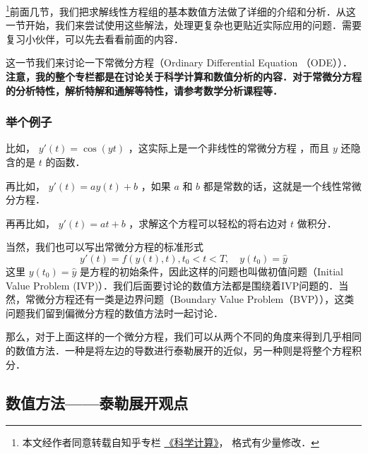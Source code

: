 
\footnote{本文经作者同意转载自知乎专栏 \href{https://www.zhihu.com/column/c_1226443594048942080}{《科学计算》}， 格式有少量修改．}前面几节，我们把求解线性方程组的基本数值方法做了详细的介绍和分析．从这一节开始，我们来尝试使用这些解法，处理更复杂也更贴近实际应用的问题．需要复习小伙伴，可以先去看看前面的内容．

这一节我们来讨论一下常微分方程（Ordinary Differential Equation （ODE））．\textbf{注意，我的整个专栏都是在讨论关于科学计算和数值分析的内容．对于常微分方程的分析特性，解析特解和通解等特性，请参考数学分析课程等．}

\subsubsection{举个例子}

比如， $y'(t)=\cos(yt)$ ，这实际上是一个非线性的常微分方程 ，而且 $y$ 还隐含的是 $t$ 的函数．

再比如， $y'(t)=ay(t)+b$ ，如果 $a$ 和 $b$ 都是常数的话，这就是一个线性常微分方程．

再再比如， $y'(t)=at+b$ ，求解这个方程可以轻松的将右边对 $t$ 做积分．

当然，我们也可以写出常微分方程的标准形式
\begin{equation}
y'(t)=f(y(t),t),t _0 < t < T,\quad y(t_0)=\hat{y}
\end{equation}
这里 $y(t_0)=\hat{y}$ 是方程的初始条件，因此这样的问题也叫做初值问题（Initial Value Problem (IVP)）．我们后面要讨论的数值方法都是围绕着IVP问题的．当然，常微分方程还有一类是边界问题（Boundary Value Problem（BVP）），这类问题我们留到偏微分方程的数值方法时一起讨论．

那么，对于上面这样的一个微分方程，我们可以从两个不同的角度来得到几乎相同的数值方法．一种是将左边的导数进行泰勒展开的近似，另一种则是将整个方程积分．

\subsection{数值方法——泰勒展开观点}

